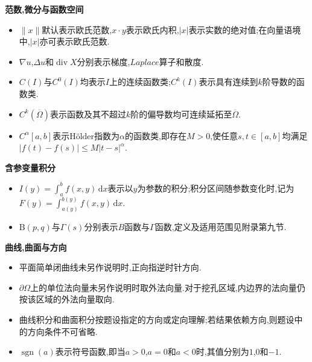 \documentclass[a4paper,12pt,fleqn,openany,twoside,fontset=windows]{ctexbook}
\begin{document}
\begin{booknotelongbody}
\textbf{范数,微分与函数空间}

\begin{itemize}[leftmargin=2\ccwd,itemsep=0.5em,topsep=0.4em]
    \item $\displaystyle\lVert x\rVert$默认表示欧氏范数,$\displaystyle x\cdot y$表示欧氏内积,$\displaystyle|x|$表示实数的绝对值;在向量语境中,$\displaystyle|x|$亦可表示欧氏范数.
    \item $\displaystyle\nabla u$,$\displaystyle\Delta u$和$\displaystyle\operatorname{div}X$分别表示梯度,$Laplace$算子和散度.
    \item $\displaystyle C(I)$与$\displaystyle C^0(I)$均表示$\displaystyle I$上的连续函数类;$\displaystyle C^k(I)$表示具有连续到$\displaystyle k$阶导数的函数类.
    \item $\displaystyle C^k(\overline\Omega)$表示函数及其不超过$\displaystyle k$阶的偏导数均可连续延拓至$\displaystyle\overline\Omega$.
    \item $\displaystyle C^\alpha[a,b]$表示$\text{Hölder}$指数为$\displaystyle\alpha$的函数类,即存在$\displaystyle M>0$,使任意$\displaystyle s,t\in[a,b]$均满足$\displaystyle|f(t)-f(s)|\leq M|t-s|^\alpha$.
\end{itemize}

\textbf{含参变量积分}

\begin{itemize}[leftmargin=2\ccwd,itemsep=0.5em,topsep=0.4em]
    \item $\displaystyle I(y)=\int_a^b f(x,y)\,\mathrm{d}x$表示以$\displaystyle y$为参数的积分;积分区间随参数变化时,记为$\displaystyle F(y)=\int_{a(y)}^{b(y)}f(x,y)\,\mathrm{d}x$.
    \item $\displaystyle\mathrm{B}(p,q)$与$\displaystyle\Gamma(s)$分别表示$\displaystyle B$函数与$\displaystyle\Gamma$函数,定义及适用范围见附录第九节.
\end{itemize}

\textbf{曲线,曲面与方向}

\begin{itemize}[leftmargin=2\ccwd,itemsep=0.5em,topsep=0.4em]
    \item 平面简单闭曲线未另作说明时,正向指逆时针方向.
    \item $\displaystyle\partial\Omega$上的单位法向量未另作说明时取外法向量.对于挖孔区域,内边界的法向量仍按该区域的外法向量取向.
    \item 曲线积分和曲面积分按题设指定的方向或定向理解;若结果依赖方向,则题设中的方向条件不可省略.
    \item $\displaystyle\operatorname{sgn}(a)$表示符号函数,即当$\displaystyle a>0$,$\displaystyle a=0$和$\displaystyle a<0$时,其值分别为$\displaystyle1$,$\displaystyle0$和$\displaystyle-1$.
\end{itemize}


\end{booknotelongbody}
\pagestyle{main}
\clearpage
\end{document}
